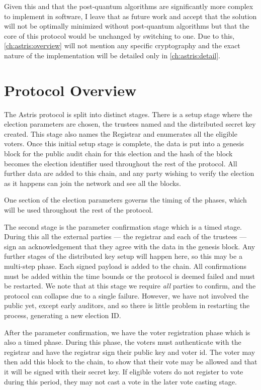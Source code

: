 Given this and that the post-quantum algorithms are significantly more complex to implement in software, I leave that as future work and accept that the solution will not be optimally minimized without post-quantum algorithms but that the core of this protocol would be unchanged by switching to one. Due to this, \autoref{ch:astris:overview} will not mention any specific cryptography and the exact nature of the implementation will be detailed only in \autoref{ch:astris:detail}.

\section{Protocol Overview}
\label{ch:astris:overview}

The Astris protocol is split into distinct stages. There is a setup stage where the election parameters are chosen, the trustees named and the distributed secret key created. This stage also names the Registrar and enumerates all the eligible voters. Once this initial setup stage is complete, the data is put into a genesis block for the public audit chain for this election and the hash of the block becomes the election identifier used throughout the rest of the protocol. All further data are added to this chain, and any party wishing to verify the election as it happens can join the network and see all the blocks.

One section of the election parameters governs the timing of the phases, which will be used throughout the rest of the protocol.

The second stage is the parameter confirmation stage which is a timed stage. During this all the external parties --- the registrar and each of the trustees --- sign an acknowledgement that they agree with the data in the genesis block. Any further stages of the distributed key setup will happen here, so this may be a multi-step phase. Each signed payload is added to the chain. All confirmations must be added within the time bounds or the protocol is deemed failed and must be restarted. We note that at this stage we require \emph{all} parties to confirm, and the protocol can collapse due to a single failure. However, we have not involved the public yet, except early auditors, and so there is little problem in restarting the process, generating a new election ID.

After the parameter confirmation, we have the voter registration phase which is also a timed phase. During this phase, the voters must authenticate with the registrar and have the registrar sign their public key and voter id. The voter may then add this block to the chain, to show that their vote may be allowed and that it will be signed with their secret key. If eligible voters do not register to vote during this period, they may not cast a vote in the later vote casting stage.

